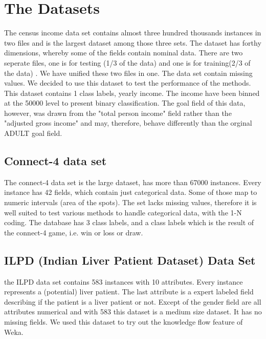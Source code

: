 \documentclass[a4paper]{article}
\begin{document}
\section{The Datasets}
The census income data set contains almost three hundred thousands instances in
two files and is the largest dataset among those three sets. The dataset has
forthy dimensions, whereby some of the fields contain nominal data. There are
two seperate files, one is for testing (1/3 of the data) and one is for
training(2/3 of the data) . We have unified these two files in one. The data set
contain missing values. We decided to use this dataset to test the performance
of the methods. This dataset contains 1 class labels, yearly income. The income
have been binned at the 50000 level to present binary classification. The goal
field of this data, however, was drawn from the "total person income" field
rather than the "adjusted gross income" and may, therefore, behave differently
than the orginal ADULT goal field.

\subsection{Connect-4 data set}
The connect-4 data set is the large dataset, has more than 67000 instances.
Every instance has 42 fields, which contain just categorical data. Some of those
map to numeric intervals
(area of the spots). The set lacks missing values, therefore it is well suited
to test various methods to handle categorical data, with the 1-N coding. The
database has 3 class labels, and a class labels which
is the result of the connect-4 game, i.e. win or loss or draw.

\subsection{ILPD (Indian Liver Patient Dataset) Data Set}
the ILPD data set contains 583 instances with 10 attributes. Every instance represents a
(potential) liver patient. The last attribute is a expert labeled field describing if the patient is 
a liver patient or not. Except of the gender field are all attributes numerical
and with 583 this dataset is a medium size dataset. It has no missing fields. 
We used this dataset to try out the knowledge flow feature of Weka.
\end{document}
